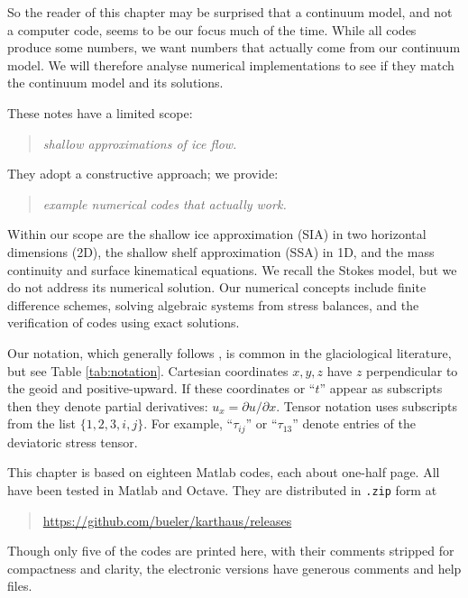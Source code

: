 \documentclass[letterpaper,final,12pt,reqno]{amsart}
\begin{document}
So the reader of this chapter may be surprised that a continuum model, and not a computer code, seems to be our focus much of the time.  While all codes produce some numbers, we want numbers that actually come from our continuum model.  We will therefore analyse numerical implementations to see if they match the continuum model and its solutions.

These notes have a limited scope:
  \begin{quote}\emph{shallow approximations of ice flow.}\end{quote}
They adopt a constructive approach; we provide:
  \begin{quote}\emph{example numerical codes that actually work.}\end{quote}
Within our scope are the shallow ice approximation (SIA) in two horizontal dimensions (2D), the shallow shelf approximation (SSA) in 1D, and the mass continuity and surface kinematical equations.  We recall the Stokes model, but we do not address its numerical solution.  Our numerical concepts include finite difference schemes, solving algebraic systems from stress balances, and the verification of codes using exact solutions.

Our notation, which generally follows \cite{GreveBlatter2009}, is common in the glaciological literature, but see Table \ref{tab:notation}.  Cartesian coordinates $x,y,z$ have $z$ perpendicular to the geoid and positive-upward.  If these coordinates or ``$t$'' appear as subscripts then they denote partial derivatives: $u_x = \partial u/\partial x$.  Tensor notation uses subscripts from the list $\{1,2,3,i,j\}$.  For example, ``$\tau_{ij}$'' or ``$\tau_{13}$'' denote entries of the deviatoric stress tensor.

This chapter is based on eighteen Matlab codes, each about one-half page.  All have been tested in Matlab and Octave.  They are distributed in \texttt{.zip} form at
\begin{quote}
\url{https://github.com/bueler/karthaus/releases}
\end{quote}
\noindent Though only five of the codes are printed here, with their comments stripped for compactness and clarity, the electronic versions have generous comments and help files.
\end{document}
